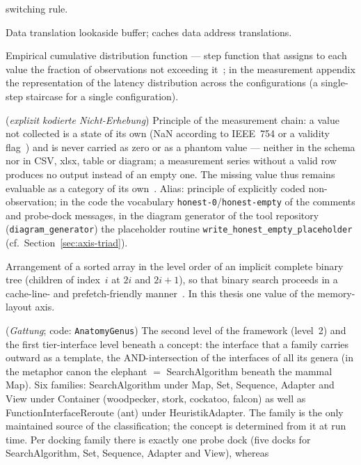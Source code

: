\begin{description}
  switching rule.
  \item[dTLB] Data translation lookaside buffer; caches data address translations.
  \item[ECDF] Empirical cumulative distribution function --- step function that assigns to each
  value the fraction of observations not exceeding it~\cite{wilk1968probability}; in the
  measurement appendix the representation of the latency distribution across the configurations
  (a single-step staircase for a single configuration).
  \item[Explicitly coded non-observation] (\emph{explizit kodierte Nicht-Erhebung}) Principle of
  the measurement chain: a value not collected is a state of its own (NaN according to IEEE~754 or
  a validity flag~\cite{ieee754_2019}) and is never carried as zero or as a phantom value ---
  neither in the schema nor in CSV, xlsx, table or diagram; a measurement series without a valid
  row produces no output instead of an empty one. The missing value thus remains evaluable as a
  category of its own~\cite{graham2009missing}. Alias: principle of explicitly coded
  non-observation; in the code the vocabulary \texttt{honest-0}/\texttt{honest-empty} of the
  comments and probe-dock messages, in the diagram generator of the tool repository
  (\texttt{diagram\_generator}) the placeholder routine
  \texttt{write\_honest\_empty\_placeholder} (cf.\ Section~\ref{sec:axis-triad}).
  \item[Eytzinger layout] Arrangement of a sorted array in the level order of an implicit complete
  binary tree (children of index~$i$ at $2i$ and $2i+1$), so that binary search proceeds in a
  cache-line- and prefetch-friendly manner~\cite{khuong2017eytzinger}. In this thesis one value of
  the memory-layout axis.
  \item[Family] (\emph{Gattung}; code: \texttt{AnatomyGenus}) The second level of the framework
  (level~2) and the first tier-interface level beneath a concept: the interface that a family carries
  outward as a template, the AND-intersection of the interfaces of all its genera (in the metaphor
  canon the elephant $=$ SearchAlgorithm beneath the mammal Map). Six families: SearchAlgorithm under
  Map, Set, Sequence, Adapter and View under Container (woodpecker, stork, cockatoo, falcon) as well
  as FunctionInterfaceReroute (ant) under HeuristikAdapter. The family is the only maintained source
  of the classification; the concept is determined from it at run time. Per docking family there is
  exactly one probe dock (five docks for SearchAlgorithm, Set, Sequence, Adapter and View), whereas

\end{description}
